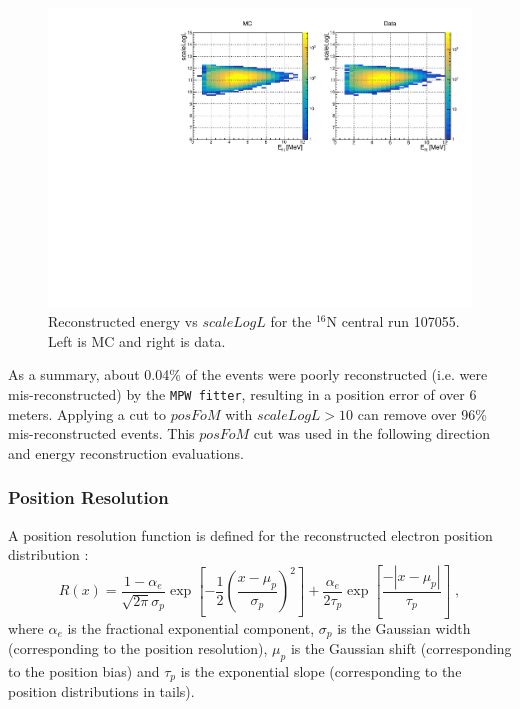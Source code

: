 \begin{figure}[!htb]
	\centering
	\includegraphics[width=13cm]{N16_107055_scaleLogLvsEnergy.pdf}
	\caption[Reconstructed energy vs $scaleLogL$ for the $^{16}$N central run 107055.]{Reconstructed energy vs $scaleLogL$ for the $^{16}$N central run 107055. Left is MC and right is data.\label{energyVsFOM}}
\end{figure}

As a summary, about 0.04\% of the events were poorly reconstructed (i.e. were mis-reconstructed) by the \texttt{MPW fitter}, resulting in a position error of over 6 meters. Applying a cut to $posFoM$ with $scaleLogL>10$ can remove over 96\% mis-reconstructed events. This $posFoM$ cut was used in the following direction and energy reconstruction evaluations.

\subsubsection{Position Resolution}\label{sect:positionResol}

A position resolution function is defined for the reconstructed electron position distribution \cite{boulay2004direct}:
\begin{equation}
R(x)=\frac{1-\alpha_e}{\sqrt{2\pi}\sigma_p}\exp{[-\frac{1}{2}(\frac{x-\mu_p}{\sigma_p})^2]+\frac{\alpha_e}{2\tau_p}\exp{[\frac{-|x-\mu_p|}{\tau_p}]}}\;,
\end{equation}
where $\alpha_e$ is the fractional exponential component, $\sigma_p$ is the Gaussian width (corresponding to the position resolution), $\mu_p$ is the Gaussian shift (corresponding to the position bias) and $\tau_p$ is the exponential slope (corresponding to the position distributions in tails).

